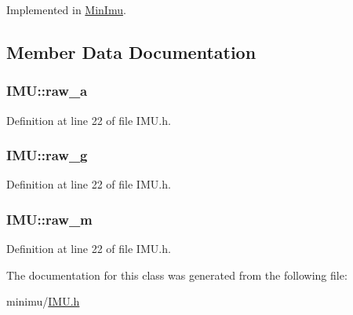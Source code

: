 \-Implemented in \hyperlink{class_min_imu_add98c9a8e002a56ccb4978079ac2dbfe}{\-Min\-Imu}.



\subsection{\-Member \-Data \-Documentation}
\hypertarget{class_i_m_u_acd6307b0f4f44bd6f057cd8f85080668}{
\subsubsection[{raw\-\_\-a}]{ {\bf \-I\-M\-U\-::raw\-\_\-a}}}\label{class_i_m_u_acd6307b0f4f44bd6f057cd8f85080668}


\-Definition at line 22 of file \-I\-M\-U.\-h.

\hypertarget{class_i_m_u_aa63b8395ba841c899a926fc47d4a2435}{
\subsubsection[{raw\-\_\-g}]{ {\bf \-I\-M\-U\-::raw\-\_\-g}}}\label{class_i_m_u_aa63b8395ba841c899a926fc47d4a2435}


\-Definition at line 22 of file \-I\-M\-U.\-h.

\hypertarget{class_i_m_u_ad822d0a58bd3050a42cd377453521b5f}{
\subsubsection[{raw\-\_\-m}]{ {\bf \-I\-M\-U\-::raw\-\_\-m}}}\label{class_i_m_u_ad822d0a58bd3050a42cd377453521b5f}


\-Definition at line 22 of file \-I\-M\-U.\-h.



\-The documentation for this class was generated from the following file\-:\begin{DoxyCompactItemize}
\item 
minimu/\hyperlink{_i_m_u_8h}{\-I\-M\-U.\-h}\end{DoxyCompactItemize}
